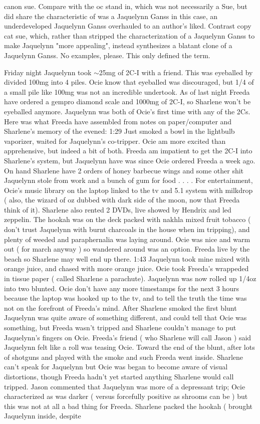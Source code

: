 \documentclass[12pt]{book}
\begin{document}
canon sue. Compare with the oc stand in, which was not necessarily a Sue, but did share the characteristic of was a Jaquelynn Ganss  in this case, an underdeveloped Jaquelynn Ganss  overhauled to an author's liked. Contrast copy cat sue, which, rather than stripped the characterization of a Jaquelynn Ganss to make Jaquelynn "more appealing", instead synthesizes a blatant clone of a Jaquelynn Ganss. No examples, please. This only defined the term.



Friday night Jaquelynn took $\sim$25mg of 2C-I with a friend. This was eyeballed by divided 100mg into 4 piles. Ocie know that eyeballed was discouraged, but 1/4 of a small pile like 100mg was not an incredible undertook. As of last night Freeda have ordered a gempro diamond scale and 1000mg of 2C-I, so Sharlene won't be eyeballed anymore. Jaquelynn was both of Ocie's first time with any of the 2Cs. Here was what Freeda have assembled from notes on paper/computer and Sharlene's memory of the evened: 1:29 Just smoked a bowl in the lightbulb vaporizer, waited for Jaquelynn's co-tripper. Ocie am more excited than apprehensive, but indeed a bit of both. Freeda am impatient to get the 2C-I into Sharlene's system, but Jaquelynn have was since Ocie ordered Freeda a week ago. On hand Sharlene have 2 orders of honey barbecue wings and some other shit Jaquelynn stole from work and a bunch of gum for food . . . . For entertainment, Ocie's music library on the laptop linked to the tv and 5.1 system with milkdrop ( also, the wizard of oz dubbed with dark side of the moon, now that Freeda think of it). Sharlene also rented 2 DVDs, live showed by Hendrix and led zeppelin. The hookah was on the deck packed with nakhla mixed fruit tobacco ( don't trust Jaquelynn with burnt charcoals in the house when im tripping), and plenty of weeded and paraphernalia was laying around. Ocie was nice and warm out ( for march anyway ) so wandered around was an option. Freeda live by the beach so Sharlene may well end up there. 1:43 Jaquelynn took mine mixed with orange juice, and chased with more orange juice. Ocie took Freeda's wrappeded in tissue paper ( called Sharlene a parachute). Jaquelynn was now rolled up 1/4oz into two blunted. Ocie don't have any more timestamps for the next 3 hours because the laptop was hooked up to the tv, and to tell the truth the time was not on the forefront of Freeda's mind. After Sharlene smoked the first blunt Jaquelynn was quite aware of something different, and could tell that Ocie was something, but Freeda wasn't tripped and Sharlene couldn't manage to put Jaquelynn's fingers on Ocie. Freeda's friend ( who Sharlene will call Jason ) said Jaquelynn felt like a roll was teasing Ocie. Toward the end of the blunt, after lots of shotguns and played with the smoke and such Freeda went inside. Sharlene can't speak for Jaquelynn but Ocie was began to become aware of visual distortions, though Freeda hadn't yet started anything Sharlene would call tripped. Jason commented that Jaquelynn was more of a depressant trip; Ocie characterized as was darker ( versus forcefully positive as shrooms can be ) but this was not at all a bad thing for Freeda. Sharlene packed the hookah ( brought Jaquelynn inside, despite 
\end{document}
